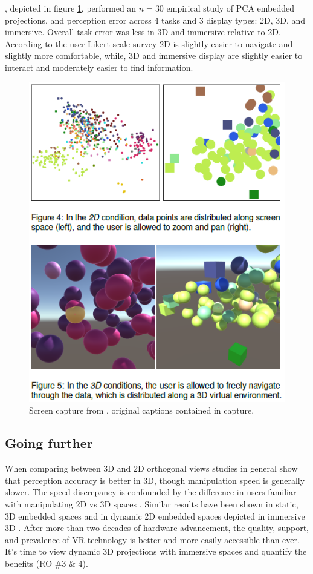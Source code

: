 \documentclass{monashthesis}
\begin{document}
\textcite{wagner_filho_immersive_2018}, depicted in figure
\ref{fig:wagner18fig}, performed an \(n=30\) empirical study of PCA
embedded projections, and perception error across 4 tasks and 3 display
types: 2D, 3D, and immersive. Overall task error was less in 3D and
immersive relative to 2D. According to the user Likert-scale survey 2D
is slightly easier to navigate and slightly more comfortable, while, 3D
and immersive display are slightly easier to interact and moderately
easier to find information.





\begin{figure}

{\centering \includegraphics[width=0.5\linewidth]{./figures/wagner18fig} 

}

\caption{Screen capture from
\textcite{wagner_filho_immersive_2018}, original captions contained in
capture.}\label{fig:wagner18fig}
\end{figure}

\subsection{Going further}\label{going-further-1}

When comparing between 3D and 2D orthogonal views studies in general
show that perception accuracy is better in 3D, though manipulation speed
is generally slower. The speed discrepancy is confounded by the
difference in users familiar with manipulating 2D vs 3D spaces
\autocites{lee_effects_1986}{wickens_implications_1994}{tory_visualization_2006}[counter
example][]{sedlmair_empirical_2013}. Similar results have been shown in
static, 3D embedded spaces
\autocites{gracia_new_2016}{wagner_filho_immersive_2018} and in dynamic
2D embedded spaces depicted in immersive 3D
\autocite{nelson_xgobi_1998}. After more than two decades of hardware
advancement, the quality, support, and prevalence of VR technology is
better and more easily accessible than ever. It's time to view dynamic
3D projections with immersive spaces and quantify the benefits (RO \#3
\& 4).
\end{document}
